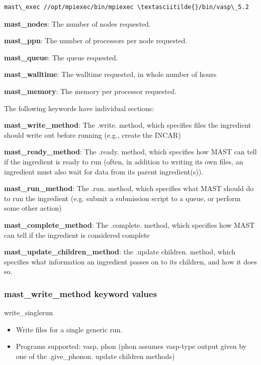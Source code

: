 \documentclass[letterpaper,10pt,english]{sphinxmanual}
\begin{document}
\begin{Verbatim}[commandchars=\\\{\}]
mast\_exec //opt/mpiexec/bin/mpiexec \textasciitilde{}/bin/vasp\_5.2
\end{Verbatim}

\textbf{mast\_nodes}: The number of nodes requested.

\textbf{mast\_ppn}: The number of processors per node requested.

\textbf{mast\_queue}: The queue requested.

\textbf{mast\_walltime}: The walltime requested, in whole number of hours

\textbf{mast\_memory}: The memory per processor requested.

The following keywords have individual sections:

\textbf{mast\_write\_method}: The .write. method, which specifies files the ingredient should write out before running (e.g., create the INCAR)

\textbf{mast\_ready\_method}: The .ready. method, which specifies how MAST can tell if the ingredient is ready to run (often, in addition to writing its own files, an ingredient must also wait for data from its parent ingredient(s)).

\textbf{mast\_run\_method}: The .run. method, which specifies what MAST should do to run the ingredient (e.g. submit a submission script to a queue, or perform some other action)

\textbf{mast\_complete\_method}: The .complete. method, which specifies how MAST can tell if the ingredient is considered complete

\textbf{mast\_update\_children\_method}: the .update children. method, which specifies what information an ingredient passes on to its children, and how it does so.


\subsubsection{mast\_write\_method keyword values}
\label{3_0_inputfile:mast-write-method-keyword-values}
write\_singlerun
\begin{itemize}
\item {} 
Write files for a single generic run.

\item {} 
Programs supported: vasp, phon (phon assumes vasp-type output given by one of the .give\_phonon. update children methods)

\end{itemize}
\end{document}
